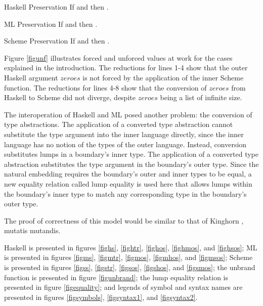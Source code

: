 \begin{theorem}{Haskell Preservation}
If \judeh{\env}{\first{\varexph}}{\first{\vartyh}} and \redruleh{\first{\varexph}}{\second{\varexph}} then \judeh{\env}{\second{\varexph}}{\first{\vartyh}}.
\end{theorem}

\begin{theorem}{ML Preservation}
If \judem{\env}{\first{\varexpm}}{\first{\vartym}} and \first{\varexpm} \red \second{\varexpm} then \judem{\env}{\second{\varexpm}}{\first{\vartym}}.
\end{theorem}

\begin{theorem}{Scheme Preservation}
If \judes{\env}{\first{\varexps}}{\tytst} and \first{\varexps} \red \second{\varexps} then \judes{\env}{\second{\varexps}}{\tytst}.
\end{theorem}

Figure \ref{figunf} illustrates forced and unforced values at work for the cases explained in the introduction. The reductions for lines 1-4 show that the outer Haskell argument $zeroes$ is not forced by the application of the inner Scheme function. The reductions for lines 4-8 show that the conversion of $zeroes$ from Haskell to Scheme did not diverge, despite $zeroes$ being a list of infinite size.



The interoperation of Haskell and ML posed another problem: the conversion of type abstractions. The application of a converted type abstraction cannot substitute the type argument into the inner language directly, since the inner language has no notion of the types of the outer language. Instead, conversion substitutes lumps in a boundary's inner type. The application of a converted type abstraction substitutes the type argument in the boundary's outer type. Since the natural embedding \cite{matthews07} requires the boundary's outer and inner types to be equal, a new equality relation called lump equality is used here that allows lumps within the boundary's inner type to match any corresponding type in the boundary's outer type.

The proof of correctness of this model would be similar to that of Kinghorn \cite{kinghorn07}, mutatis mutandis.

Haskell is presented in figures \ref{fighs}, \ref{fightr}, \ref{fighos}, \ref{fighmos}, and \ref{fighsos}; ML is presented in figures \ref{figms}, \ref{figmtr}, \ref{figmos}, \ref{figmhos}, and \ref{figmsos}; Scheme is presented in figures \ref{figss}, \ref{figstr}, \ref{figsos}, \ref{figshos}, and \ref{figsmos}; the unbrand function is presented in figure \ref{figunbrand}; the lump equality relation is presented in figure \ref{figequality}; and legends of symbol and syntax names are presented in figures \ref{figsymbols}, \ref{figsyntax1}, and \ref{figsyntax2}.

